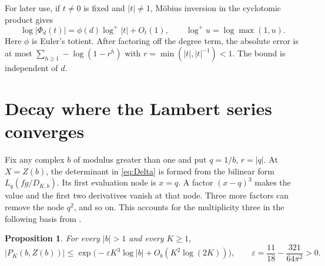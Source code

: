 \documentclass[11pt,letterpaper]{article}
\newtheorem{proposition}[theorem]{Proposition}
\numberwithin{equation}{section}
\begin{document}
For later use, if \(t\ne0\) is fixed and \(|t|\ne1\), Möbius
inversion in the cyclotomic product gives
\begin{equation}\label{eq:cyclotomic-away}
  \log|\Phi_d(t)|=\phi(d)\log^+|t|+O_t(1),\qquad
  \log^+u=\log\max(1,u).
\end{equation}
Here \(\phi\) is Euler's totient. After factoring off the degree
term, the absolute error is at most
\(\sum_{h\ge1}-\log(1-r^h)\) with \(r=\min(|t|,|t|^{-1})<1\).
The bound is independent of \(d\).

\section{Decay where the Lambert series converges}\label{sec:expanding}

Fix any complex \(b\) of modulus greater than one and put \(q=1/b\),
\(r=|q|\). At \(X=Z(b)\), the determinant in \eqref{eq:Delta} is
formed from the bilinear form \(L_q(fg/D_{K,b})\). Its first evaluation
node is \(x=q\). A factor \((x-q)^3\) makes the value and the first
two derivatives vanish at that node. Three more factors can remove
the node \(q^2\), and so on. This accounts for the multiplicity
three in the following basis from \cite[\S2]{Uplift}.

\begin{proposition}\label{prop:decay}
For every \(|b|>1\) and every \(K\ge1\),
\[
 |P_K(b,Z(b))|\le
 \exp\bigl(-\varepsilon K^3\log|b|+O_b(K^2\log(2K))\bigr),
 \qquad \varepsilon=\frac{11}{18}-\frac{321}{64\pi^2}>0.
\]
\end{proposition}
\end{document}
